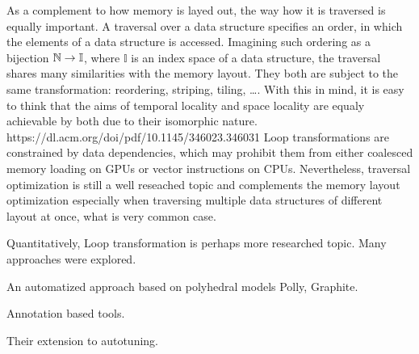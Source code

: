 As a complement to how memory is layed out, the way how it is traversed is equally important. A traversal over a data structure specifies an order, in which the elements of a data structure is accessed. Imagining such ordering as a bijection $\mathbb{N} \to \mathbb{I}$, where $\mathbb{I}$ is an index space of a data structure, the traversal shares many similarities with the memory layout. They both are subject to the same transformation: reordering, striping, tiling, \dots. With this in mind, it is easy to think that the aims of temporal locality and space locality are equaly achievable by both due to their isomorphic nature. https://dl.acm.org/doi/pdf/10.1145/346023.346031
Loop transformations are constrained by data dependencies, which may prohibit them from either coalesced memory loading on GPUs or vector instructions on CPUs. Nevertheless, traversal optimization is still a well reseached topic and complements the memory layout optimization especially when traversing multiple data structures of different layout at once, what is very common case.

Quantitatively, Loop transformation is perhaps more researched topic. Many approaches were explored. 

An automatized approach based on polyhedral models Polly, Graphite.

Annotation based tools.

Their extension to autotuning.


